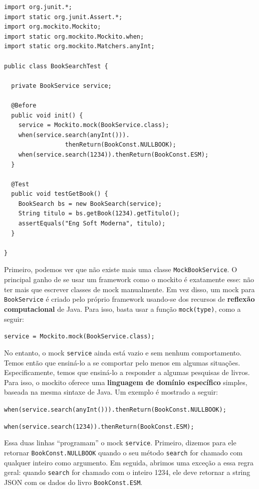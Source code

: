 \documentclass[
  11pt,
  twoside]{book}
\newcommand{\passthrough}[1]{#1}
\begin{document}
\begin{lstlisting}
import org.junit.*;
import static org.junit.Assert.*;
import org.mockito.Mockito;
import static org.mockito.Mockito.when;
import static org.mockito.Matchers.anyInt;

public class BookSearchTest {

  private BookService service;

  @Before
  public void init() {
    service = Mockito.mock(BookService.class);
    when(service.search(anyInt())).
                 thenReturn(BookConst.NULLBOOK);
    when(service.search(1234)).thenReturn(BookConst.ESM);
  }        

  @Test
  public void testGetBook() {
    BookSearch bs = new BookSearch(service);
    String titulo = bs.getBook(1234).getTitulo();
    assertEquals("Eng Soft Moderna", titulo);
  }

}
\end{lstlisting}

Primeiro, podemos ver que não existe mais uma classe
\passthrough{\lstinline!MockBookService!}. O principal ganho de se usar
um framework como o mockito é exatamente esse: não ter mais que escrever
classes de mock manualmente. Em vez disso, um mock para
\passthrough{\lstinline!BookService!} é criado pelo próprio framework
usando-se dos recursos de \textbf{reflexão computacional} de Java. Para
isso, basta usar a função \passthrough{\lstinline!mock(type)!}, como a
seguir:

\passthrough{\lstinline!service = Mockito.mock(BookService.class);!}

No entanto, o mock \passthrough{\lstinline!service!} ainda está vazio e
sem nenhum comportamento. Temos então que ensiná-lo a se comportar pelo
menos em algumas situações. Especificamente, temos que ensiná-lo a
responder a algumas pesquisas de livros. Para isso, o mockito oferece
uma \textbf{linguagem de domínio específico} simples, baseada na mesma
sintaxe de Java. Um exemplo é mostrado a seguir:

\passthrough{\lstinline!when(service.search(anyInt())).thenReturn(BookConst.NULLBOOK);!}

\passthrough{\lstinline!when(service.search(1234)).thenReturn(BookConst.ESM);!}

Essa duas linhas ``programam'' o mock \passthrough{\lstinline!service!}.
Primeiro, dizemos para ele retornar
\passthrough{\lstinline!BookConst.NULLBOOK!} quando o seu método
\passthrough{\lstinline!search!} for chamado com qualquer inteiro como
argumento. Em seguida, abrimos uma exceção a essa regra geral: quando
\passthrough{\lstinline!search!} for chamado com o inteiro 1234, ele
deve retornar a string JSON com os dados do livro
\passthrough{\lstinline!BookConst.ESM!}.
\end{document}
